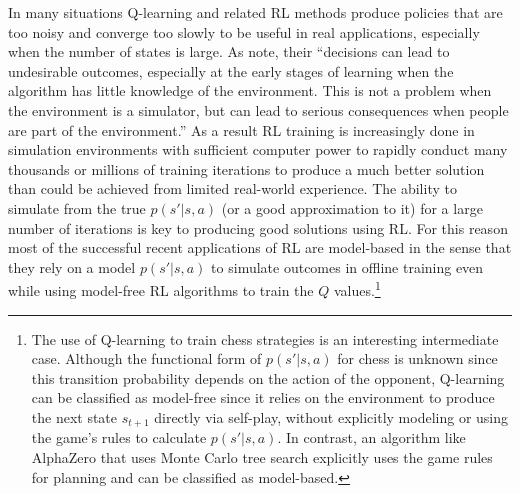 In many situations Q-learning and related RL methods produce policies that
are too noisy and converge too slowly to be useful in 
real applications, especially when the number of states is large.  As \citet{JiangXie:2024} note, their
``decisions can lead to undesirable outcomes, especially at the early stages of learning when the algorithm has little knowledge of the environment. This is not a problem when the environment is a simulator, but can lead to serious consequences when people are part of the environment.''
As a result RL training is increasingly done in simulation environments with
sufficient computer power to rapidly conduct many thousands or millions of training iterations to produce a much better solution than could be achieved
from limited real-world experience.  The ability to simulate from the true $p(s'|s,a)$  (or a good approximation to it)
for a large number of iterations is  key to producing good solutions using RL. For this reason most of the successful recent applications
of RL are  model-based in the sense that they rely on a model $p(s'|s,a)$ to simulate outcomes in offline
training even while using model-free RL algorithms to train the $Q$ values.\footnote{\footnotesize The use of Q-learning
to train chess strategies is an interesting intermediate case. Although the functional form of $p(s'|s,a)$
for chess is unknown since this transition probability depends on the action of the opponent, Q-learning can be classified as 
model-free since it relies on the environment to produce the next state $s_{t+1}$ directly
via self-play, without explicitly modeling or using the game's rules to calculate $p(s'|s,a)$.
In contrast, an algorithm like AlphaZero that uses Monte Carlo tree search explicitly uses the
game rules for planning and can be classified as model-based.}  

